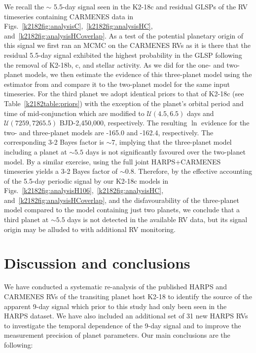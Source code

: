 We recall the $\sim$ 5.5-day signal seen in the K2-18c and residual GLSPs of the RV timeseries containing
CARMENES data in Figs.~\ref{k2182fig:analysisC},~\ref{k2182fig:analysisHC}, and~\ref{k2182fig:analysisHCoverlap}. 
As a test of the potential planetary origin of this signal we first ran an MCMC on the CARMENES RVs as it is
there that the residual 5.5-day signal exhibited the highest probability in the GLSP following the removal of K2-18b,
c, and stellar activity. As we did for the one- and two-planet models,
we then estimate the evidence of this three-planet model using the estimator from \cite{perrakis13} and compare it to the
two-planet model for the same input timeseries. For the third planet
we adopt identical priors to that of K2-18c (see Table~\ref{k2182table:priors})
with the exception of the planet's orbital period and time of mid-conjunction which are modified to
$\mathcal{U}(4.5,6.5)$ days and $\mathcal{U}(7259,7265.5)$ BJD-2,450,000, respectively.
The resulting $\ln$ evidence for the two- and three-planet models are
-165.0 and -162.4, respectively. The corresponding 3-2 Bayes factor is $\sim 7$, implying that the three-planet model
including a planet at $\sim 5.5$ days is not significantly favoured over the two-planet model. By a similar exercise,
using the full joint HARPS+CARMENES timeseries yields a 3-2 Bayes factor of $\sim 0.8$. Therefore, by the effective
accounting of the 5.5-day periodic signal by our K2-18c models in Figs.~\ref{k2182fig:analysisH106},~\ref{k2182fig:analysisHC},
and~\ref{k2182fig:analysisHCoverlap}, and the disfavourability of the three-planet model compared to the model containing
just two planets, we conclude
that a third planet at $\sim 5.5$ days is not detected in the available RV data, but its signal origin may be alluded to
with additional RV monitoring.


\section{Discussion and conclusions} \label{k2182sect:dis}
We have conducted a systematic re-analysis of the published HARPS  and CARMENES
 RVs of the transiting planet host K2-18
to identify the source of the apparent 9-day signal which prior to this study had
only been seen in the HARPS dataset. We have also included an additional set of 31 new HARPS RVs to
investigate the temporal dependence of the 9-day signal and to improve the measurement precision of
planet parameters. Our main conclusions are the following:

